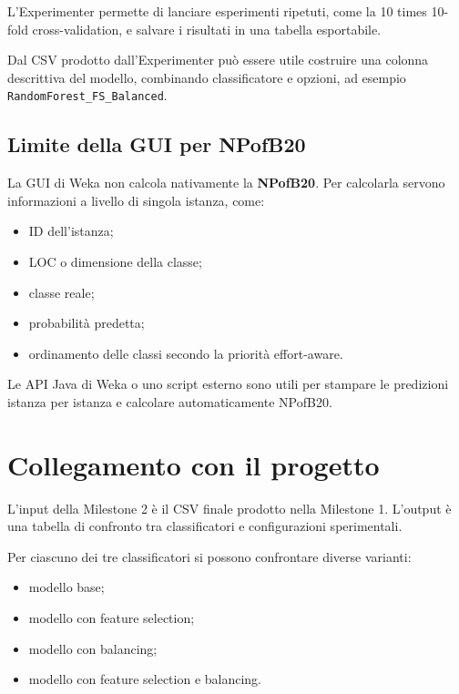 L'Experimenter permette di lanciare esperimenti ripetuti, come la 10 times 10-fold cross-validation, e salvare i risultati in una tabella esportabile.

\begin{notaprof}
Dal CSV prodotto dall'Experimenter può essere utile costruire una colonna descrittiva del modello, combinando classificatore e opzioni, ad esempio \texttt{RandomForest\_FS\_Balanced}.
\end{notaprof}

\subsection{Limite della GUI per NPofB20}

La GUI di Weka non calcola nativamente la \textbf{NPofB20}. Per calcolarla servono informazioni a livello di singola istanza, come:

\begin{itemize}
    \item ID dell'istanza;
    \item LOC o dimensione della classe;
    \item classe reale;
    \item probabilità predetta;
    \item ordinamento delle classi secondo la priorità effort-aware.
\end{itemize}

\begin{notaprof}
Le API Java di Weka o uno script esterno sono utili per stampare le predizioni istanza per istanza e calcolare automaticamente NPofB20.
\end{notaprof}

\section{Collegamento con il progetto}

L'input della Milestone 2 è il CSV finale prodotto nella Milestone 1. L'output è una tabella di confronto tra classificatori e configurazioni sperimentali.

Per ciascuno dei tre classificatori si possono confrontare diverse varianti:

\begin{itemize}
    \item modello base;
    \item modello con feature selection;
    \item modello con balancing;
    \item modello con feature selection e balancing.
\end{itemize}

